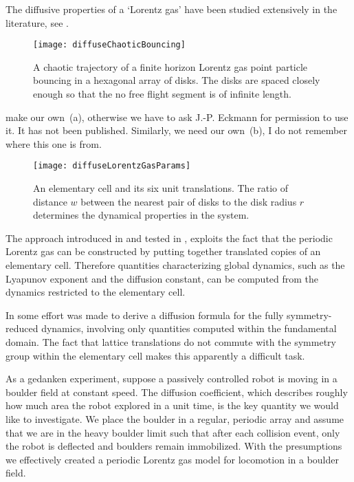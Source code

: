 
The diffusive properties of a `Lorentz gas'
have been studied extensively in the literature,
see .

\begin{figure}[htbp]
	\begin{center}
		\texttt{[image: diffuseChaoticBouncing]}
	\end{center}
	\caption[]{\label{fig-chaoticBouncing}
		A chaotic trajectory of a finite horizon Lorentz gas
		point particle bouncing in a
		hexagonal array of disks. The disks are spaced closely enough
		so that the no free flight segment is of infinite length.
	}
\end{figure}
 {make our own \,(a), otherwise
	we have to ask J.-P. Eckmann for permission to use it. It has not been
	published. Similarly, we need our own \,(b),
	I do not remember where this one is from.}

\begin{figure}[htbp]
	\begin{center}
\texttt{[image: diffuseLorentzGasParams]}
	\end{center}
	\caption[]{\label{fig-LorentzGasParams}
		An elementary cell and its six unit translations. The ratio of
		distance $w$ between the nearest pair of disks to the    disk radius
		$r$ determines the dynamical properties in the system.
	}
\end{figure}

The approach introduced in  and tested in
, exploits the fact that the periodic Lorentz gas can be
constructed by putting together translated copies of an elementary cell.
Therefore quantities characterizing global dynamics, such as the Lyapunov
exponent and the diffusion constant, can be computed from the dynamics
restricted to the elementary cell.

In  some effort was made to derive a diffusion
formula for the fully symmetry-reduced dynamics, involving only
quantities computed within the fundamental domain. The fact that lattice
translations do not commute with the symmetry group within the elementary
cell makes this apparently a difficult task.

As a gedanken experiment, suppose a passively controlled robot is moving
in a boulder field at constant speed. The diffusion coefficient, which
describes roughly how much area the robot explored in a unit time, is the
key quantity we would like to investigate. We place the boulder in a
regular, periodic array and assume that we are in the heavy boulder limit
such that after each collision event, only the robot is deflected and
boulders remain immobilized. With the presumptions we effectively created
a periodic Lorentz gas model for locomotion in a boulder
field.

